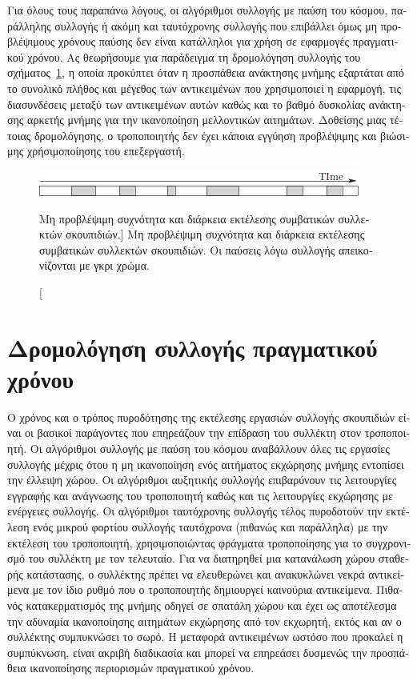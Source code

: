 \begin{greek}
Για όλους τους παραπάνω λόγους, οι αλγόριθμοι συλλογής με
παύση του κόσμου, παράλληλης συλλογής ή ακόμη και ταυτόχρονης
συλλογής που επιβάλλει όμως μη προβλέψιμους χρόνους παύσης
δεν είναι κατάλληλοι για χρήση σε εφαρμογές πραγματικού
χρόνου. Ας θεωρήσουμε για παράδειγμα τη δρομολόγηση συλλογής
του σχήματος~\ref{fig:rt_1}, η οποία προκύπτει όταν η προσπάθεια
ανάκτησης μνήμης εξαρτάται από το συνολικό πλήθος και μέγεθος
των αντικειμένων που χρησιμοποιεί η εφαρμογή, τις διασυνδέσεις
μεταξύ των αντικειμένων αυτών καθώς και το βαθμό δυσκολίας ανάκτησης
αρκετής μνήμης για την ικανοποίηση μελλοντικών αιτημάτων. Δοθείσης
μιας τέτοιας δρομολόγησης, ο τροποποιητής δεν έχει κάποια εγγύηση
προβλέψιμης και βιώσιμης χρήσιμοποίησης του επεξεργαστή.

\begin{figure}
  \centering
  \includegraphics{figures/rt_1}
  \caption
    [Μη προβλέψιμη συχνότητα και διάρκεια εκτέλεσης συμβατικών
     συλλεκτών σκουπιδιών.]
    {Μη προβλέψιμη συχνότητα και διάρκεια εκτέλεσης συμβατικών
     συλλεκτών σκουπιδιών. Οι παύσεις λόγω συλλογής απεικονίζονται
     με γκρι χρώμα.}
  \label{fig:rt_1} 
\end{figure}

\section{Δρομολόγηση συλλογής πραγματικού χρόνου}
Ο χρόνος και ο τρόπος πυροδότησης της εκτέλεσης εργασιών συλλογής
σκουπιδιών είναι οι βασικοί παράγοντες που επηρεάζουν την επίδραση
του συλλέκτη στον τροποποιητή. Οι αλγόριθμοι συλλογής με παύση
του κόσμου αναβάλλουν όλες τις εργασίες συλλογής μέχρις ότου η
μη ικανοποίηση ενός αιτήματος εκχώρησης μνήμης εντοπίσει την
έλλειψη χώρου. Οι αλγόριθμοι αυξητικής συλλογής επιβαρύνουν
τις λειτουργίες εγγραφής και ανάγνωσης του τροποποιητή καθώς
και τις λειτουργίες εκχώρησης με ενέργειες συλλογής. Οι αλγόριθμοι
ταυτόχρονης συλλογής τέλος πυροδοτούν την εκτέλεση ενός μικρού
φορτίου συλλογής ταυτόχρονα (πιθανώς και παράλληλα) με την
εκτέλεση του τροποποιητή, χρησιμοποιώντας φράγματα τροποποίησης
για το συγχρονισμό του συλλέκτη με τον τελευταίο. Για να διατηρηθεί
μια κατανάλωση χώρου σταθερής κατάστασης, ο συλλέκτης πρέπει
να ελευθερώνει και ανακυκλώνει νεκρά αντικείμενα με τον ίδιο
ρυθμό που ο τροποποιητής δημιουργεί καινούρια αντικείμενα.
Πιθανός κατακερματισμός της μνήμης οδηγεί σε σπατάλη χώρου και
έχει ως αποτέλεσμα την αδυναμία ικανοποίησης αιτημάτων εκχώρησης
από τον εκχωρητή, εκτός και αν ο συλλέκτης συμπυκνώσει το
σωρό. Η μεταφορά αντικειμένων ωστόσο που προκαλεί η συμπύκνωση,
είναι ακριβή διαδικασία και μπορεί να επηρεάσει δυσμενώς την
προσπάθεια ικανοποίησης περιορισμών πραγματικού χρόνου.


\end{greek}
